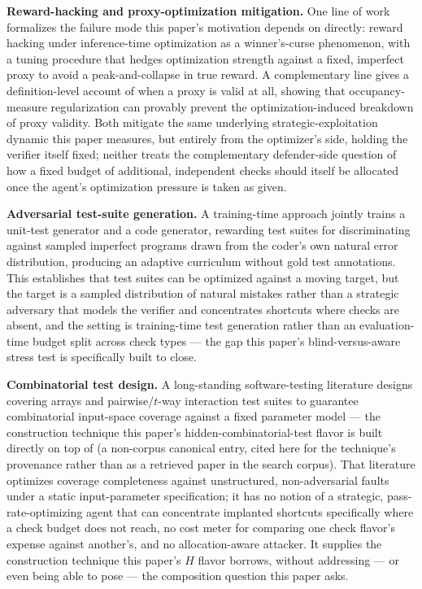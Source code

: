\documentclass[11pt]{article}
\begin{document}
\textbf{Reward-hacking and proxy-optimization mitigation.} One line of work \citep{InfTimeRewardHacking2024} formalizes the failure mode this paper's motivation depends on directly: reward hacking under inference-time optimization as a winner's-curse phenomenon, with a tuning procedure that hedges optimization strength against a fixed, imperfect proxy to avoid a peak-and-collapse in true reward. A complementary line \citep{CorrelatedProxies2024} gives a definition-level account of when a proxy is valid at all, showing that occupancy-measure regularization can provably prevent the optimization-induced breakdown of proxy validity. Both mitigate the same underlying strategic-exploitation dynamic this paper measures, but entirely from the optimizer's side, holding the verifier itself fixed; neither treats the complementary defender-side question of how a fixed budget of additional, independent checks should itself be allocated once the agent's optimization pressure is taken as given.

\textbf{Adversarial test-suite generation.} A training-time approach \citep{UTRL2024} jointly trains a unit-test generator and a code generator, rewarding test suites for discriminating against sampled imperfect programs drawn from the coder's own natural error distribution, producing an adaptive curriculum without gold test annotations. This establishes that test suites can be optimized against a moving target, but the target is a sampled distribution of natural mistakes rather than a strategic adversary that models the verifier and concentrates shortcuts where checks are absent, and the setting is training-time test generation rather than an evaluation-time budget split across check types --- the gap this paper's blind-versus-aware stress test is specifically built to close.

\textbf{Combinatorial test design.} A long-standing software-testing literature \citep{KuhnKackerLei2013CombinatorialTesting} designs covering arrays and pairwise/$t$-way interaction test suites to guarantee combinatorial input-space coverage against a fixed parameter model --- the construction technique this paper's hidden-combinatorial-test flavor is built directly on top of (a non-corpus canonical entry, cited here for the technique's provenance rather than as a retrieved paper in the search corpus). That literature optimizes coverage completeness against unstructured, non-adversarial faults under a static input-parameter specification; it has no notion of a strategic, pass-rate-optimizing agent that can concentrate implanted shortcuts specifically where a check budget does not reach, no cost meter for comparing one check flavor's expense against another's, and no allocation-aware attacker. It supplies the construction technique this paper's $H$ flavor borrows, without addressing --- or even being able to pose --- the composition question this paper asks.
\end{document}
